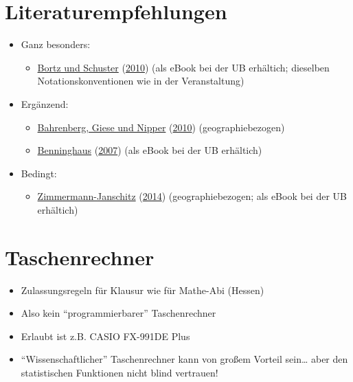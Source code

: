 \documentclass[
  11pt,
  ngerman,
  a4paper,
]{report}
\providecommand{\tightlist}{%
  \setlength{\itemsep}{0pt}\setlength{\parskip}{0pt}}
\begin{document}
\hypertarget{literaturempfehlungen}{%
\section*{Literaturempfehlungen}\label{literaturempfehlungen}}

\begin{itemize}
\tightlist
\item
  Ganz besonders:

  \begin{itemize}
  \tightlist
  \item
    \protect\hyperlink{ref-bortz}{Bortz und Schuster} (\protect\hyperlink{ref-bortz}{2010}) (als eBook bei der UB erhältich; dieselben Notationskonventionen wie in der Veranstaltung)
  \end{itemize}
\item
  Ergänzend:

  \begin{itemize}
  \tightlist
  \item
    \protect\hyperlink{ref-bahrenberg}{Bahrenberg, Giese und Nipper} (\protect\hyperlink{ref-bahrenberg}{2010}) (geographiebezogen)
  \item
    \protect\hyperlink{ref-benninghaus}{Benninghaus} (\protect\hyperlink{ref-benninghaus}{2007}) (als eBook bei der UB erhältich)
  \end{itemize}
\item
  Bedingt:

  \begin{itemize}
  \tightlist
  \item
    \protect\hyperlink{ref-zimmermann-janschitz2014a}{Zimmermann-Janschitz} (\protect\hyperlink{ref-zimmermann-janschitz2014a}{2014}) (geographiebezogen; als eBook bei der UB erhältich)
  \end{itemize}
\end{itemize}

\hypertarget{taschenrechner}{%
\section*{Taschenrechner}\label{taschenrechner}}

\begin{itemize}
\tightlist
\item
  Zulassungsregeln für Klausur wie für Mathe-Abi (Hessen)
\item
  Also kein \enquote{programmierbarer} Taschenrechner
\item
  Erlaubt ist z.B. CASIO FX-991DE Plus
\item
  \enquote{Wissenschaftlicher} Taschenrechner kann von großem Vorteil sein\ldots{} aber den statistischen Funktionen nicht blind vertrauen!
\end{itemize}
\end{document}
